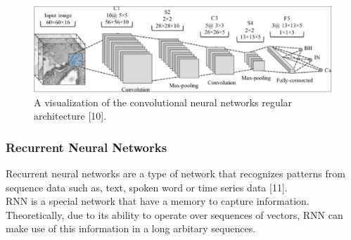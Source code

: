 \begin{figure}[ht]
\centering
\includegraphics{Figures/cnn}
\decoRule
\caption[A visualization of the convolutional neural networks regular architecture “10”]{A visualization of the convolutional neural networks regular architecture [10].}
\label{fig:la}
\end{figure}
\newpage
\subsubsection{Recurrent Neural Networks}
\hspace{5mm} Recurrent neural networks are a type of network that recognizes patterns from sequence data such as, text, spoken word or time series data [11].\\

RNN is a special network that have a memory to capture information. Theoretically, due to its ability to operate over sequences of vectors, RNN can make use of this information in a long arbitary sequences.\\

